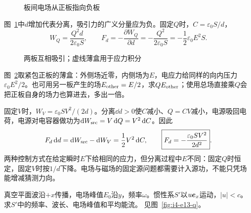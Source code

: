 \begin{figure}[H]\centering
{}
\caption{板间电场从正板指向负板}\label{fig:i4-e12-q}
\end{figure}
\begin{solution}
图~\ref{fig:i4-e12-q}中$d$增加代表分离，吸引力的广义分量应为负。固定$Q$时，$C=\varepsilon_0S/d$，
\[
W_Q=\frac{Q^2d}{2\varepsilon_0S},\qquad
F_d=-\frac{\partial W_Q}{\partial d}
=-\frac{Q^2}{2\varepsilon_0S}=-\frac12\varepsilon_0E^2S.
\]

\begin{figure}[H]\centering
{}
\caption{两板互相吸引；虚线薄盒用于应力积分}\label{fig:i4-e12-s}
\end{figure}

图~\ref{fig:i4-e12-s}取紧包正板的薄盒：外侧场近零，内侧场为$E$，电应力给同样的向内压力$\varepsilon_0E^2/2$。也可用另一板产生的场$E_{\rm other}=E/2$，求$QE_{\rm other}$；使用总场直接乘$Q$会把正板自身的场力也算进去，多出一倍。

固定$V$时，$W_V=\varepsilon_0SV^2/(2d)$。分离$\dd d>0$使$C$减小、$Q=CV$减小，电源吸回电荷，电源对电容器做功为$\mathop{}\!\mathrm d W_{\rm src}=V\mathop{}\!\mathrm d Q=V^2\mathop{}\!\mathrm d C$。因此
\[
F_d\mathop{}\!\mathrm d d=\mathop{}\!\mathrm d W_{\rm src}-\mathop{}\!\mathrm d W_V
=\frac12V^2\mathop{}\!\mathrm d C,\qquad
\boxed{F_d=-\frac{\varepsilon_0SV^2}{2d^2}}.
\]
两种控制方式在给定瞬时$E$下给相同的应力，但分离过程中$E$不同：固定$Q$时恒定，固定$V$时按$1/d$下降。电场与磁场的固定源问题都需要计入源功，不能只凭场能增减猜测力向。
\end{solution}

\begin{example}[追赶平面波的观察者]\label{ex:i4-e13}

真空平面波沿$+x$传播，电场峰值$E_0$沿$y$，频率$\omega$。惯性系$S'$以$u\bm{e}_x$运动，$|u|<c$。求$S'$中的频率、波长、电场峰值和平均能流。
 见图~\ref{fig:i4-e13-q}。
\end{example}


